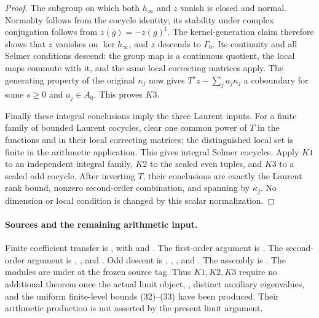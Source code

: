 \begin{proof}
The subgroup on which both $h_\infty$ and $z$ vanish is closed
and normal.  Normality follows from the cocycle identity;
its stability under complex conjugation follows from
$z(\overline g)=-z(g)^{\mathsf t}$.
The kernel-generation claim therefore shows that $z$ vanishes
on $\ker h_\infty$, and $z$ descends to $\Gamma_0$.
Its continuity and all Selmer conditions descend:
the group map is a continuous quotient, the local maps
commute with it, and the same local correcting matrices apply.
The generating property of the original $\kappa_j$ now gives
$T^s z-\sum_j a_j\kappa_j$ a coboundary for some $s\geq0$ and
$a_j\in A_0$.  This proves $K3$.

Finally these integral conclusions imply the three Laurent
inputs.  For a finite family of bounded Laurent cocycles,
clear one common power of $T$ in the functions and in their
local correcting matrices; the distinguished local set is
finite in the arithmetic application.
This gives integral Selmer cocycles.
Apply $K1$ to an independent integral family, $K2$ to the
scaled even tuples, and $K3$ to a scaled odd cocycle.
After inverting $T$, their conclusions are exactly the
Laurent rank bound, nonzero second-order combination, and
spanning by $\kappa_j$.
No dimension or local condition is changed by this scalar
normalization.
\end{proof}

\paragraph{Sources and the remaining arithmetic input.}
Finite coefficient transfer is
, with
 and
.
The first-order argument is
.
The second-order argument is
,
, and
.
Odd descent is , ,
, and .
The assembly is .
The modules are under
 at the frozen source tag.
Thus $K1,K2,K3$ require no additional theorem once the actual
limit object, , distinct auxiliary eigenvalues,
and the uniform finite-level bounds (32)--(33) have been
produced.  Their arithmetic production is not asserted by
the present limit argument.
